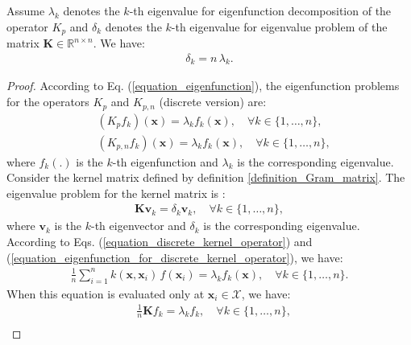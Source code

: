 \documentclass[lang=cn,10pt]{gorgeousnbook}
\numberwithin{equation}{section}%
\numberwithin{figure}{section}%
\begin{document}
\begin{lemma}
Assume $\lambda_k$ denotes the $k$-th eigenvalue for eigenfunction decomposition of the operator $K_p$ and $\delta_k$ denotes the $k$-th eigenvalue for eigenvalue problem of the matrix $\boldsymbol{K} \in \mathbb{R}^{n \times n}$. We have:
\begin{align}\label{equation_connection_eigenvalues_for_kernel_operator}
\delta_k = n\, \lambda_k.
\end{align}
\end{lemma}
\begin{proof}
According to Eq. (\ref{equation_eigenfunction}), the eigenfunction problems for the operators $K_p$ and $K_{p,n}$ (discrete version) are:
\begin{equation}\label{equation_eigenfunction_for_discrete_kernel_operator}
\begin{aligned}
&(K_p f_k)(\boldsymbol{x}) = \lambda_k f_k(\boldsymbol{x}), \quad \forall k \in \{1, \dots, n\}, \\
&(K_{p,n} f_k)(\boldsymbol{x}) = \lambda_k f_k(\boldsymbol{x}), \quad \forall k \in \{1, \dots, n\}, 
\end{aligned}
\end{equation}
where $f_k(.)$ is the $k$-th eigenfunction and $\lambda_k$ is the corresponding eigenvalue.
Consider the kernel matrix defined by definition \ref{definition_Gram_matrix}.
The eigenvalue problem for the kernel matrix is \cite{ghojogh2019eigenvalue}: 
\begin{align}\label{equation_eigenvalue_problem_kernel_operator}
\boldsymbol{K} \boldsymbol{v}_k = \delta_k \boldsymbol{v}_k, \quad \forall k \in \{1, \dots, n\},
\end{align}
where $\boldsymbol{v}_k$ is the $k$-th eigenvector and $\delta_k$ is the corresponding eigenvalue. 
According to Eqs. (\ref{equation_discrete_kernel_operator}) and (\ref{equation_eigenfunction_for_discrete_kernel_operator}), we have:
\begin{align*}
\frac{1}{n} \sum_{i=1}^n k(\boldsymbol{x},\boldsymbol{x}_i)\, f(\boldsymbol{x}_i) = \lambda_k f_k(\boldsymbol{x}), \quad \forall k \in \{1, \dots, n\}.
\end{align*}
When this equation is evaluated only at $\boldsymbol{x}_i \in \mathcal{X}$, we have:
\begin{align*}
&\frac{1}{n} \boldsymbol{K} f_k = \lambda_k f_k, \quad \forall k \in \{1, \dots, n\}, \\

\end{align*}
\end{proof}
\end{document}
